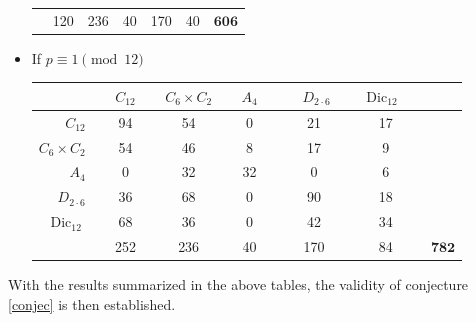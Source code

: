 \documentclass[12pt]{article}
\theoremstyle{definition}
\newcommand{\Dic}{\operatorname{Dic}}
\begin{document}
\begin{itemize}
\begin{center}
\begin{tabular}{r|c|c|c|c|c|c}
			\hline
			&120&236  & 40 & 170 &40  & $\mathbf{606}$\\
		\end{tabular}
	\end{center}
	
	\item If $p\equiv 1 \pmod{12}$
	\begin{center}
		\begin{tabular}{r|c|c|c|c|c|c}
			&\, \, $C_{12}$ \, \,   &   $C_6\times C_2$   & \, \,  $A_4$ \, \,   & \, \, $D_{2\cdot 6}$\, \,  & \, $\Dic_{12}$ \, \, & \\
			\hline
			$C_{12}$   &94 & 54& 0 & 21 &17 &\\
			$C_6\times C_2$  &54 &46 &8 & 17 &9&\\
			$A_4$   &0 &32 & 32 & 0 &6 &\\
			$D_{2\cdot 6}$  & 36 & 68&0 & 90 &18&\\
			$\Dic_{12}$    &68  &36 &0 & 42 &34&\\
			
			\hline
			&252& 236 & 40 & 170 & 84 & $\mathbf{782}$\\
		\end{tabular}
	\end{center}
	
\end{itemize}

With the results summarized in the above tables, the validity of conjecture  \eqref{conjec} is then established.
\end{document}
